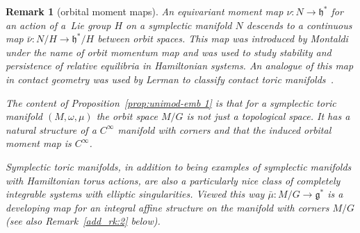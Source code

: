 \documentclass[10pt,a4paper]{amsart}
\numberwithin{equation}{section}
\newtheorem{Remark}[Lemma]{Remark}
\begin{document}
\begin{Remark}[orbital moment maps]\label{add_rk:1}
  An {\em equivariant} moment map $\nu\colon N\to {\mathfrak h}^*$ for an action of
  a~Lie group $H$ on a symplectic manifold $N$ descends to a
  continuous map $\bar{\nu}\colon N/H\to {\mathfrak h}^*/H$ between orbit spaces.
  This map was introduced by Montaldi~\cite{Montaldi} under the name
  of {\em orbit momentum map} and was used to study stability and
  persistence of relative equilibria in Hamiltonian systems.  An
  analogue of this map in contact geometry was used by Lerman to
  classify contact toric manifolds~\cite{Ltoric}.

  The content of Proposition~\ref{prop:unimod-emb 1} is that for a
  symplectic toric manifold $(M,\omega, \mu)$ the orbit space $M/G$ is
  not just a topological space.  It has a natural structure of a
  $C^\infty$ manifold with corners and that the induced orbital moment
  map is $C^\infty$.

  Symplectic toric manifolds, in addition to being examples of
  symplectic manifolds with Hamiltonian torus actions, are also a
  particularly nice class of completely integrable systems with
  elliptic singularities.  Viewed this way $\bar{\mu}\colon M/G\to {\mathfrak g}^*$ is
  a developing map for an integral af\/f\/ine structure on the manifold
  with corners $M/G$ (see also Remark~\ref{add_rk:2} below).
\end{Remark}
\end{document}
